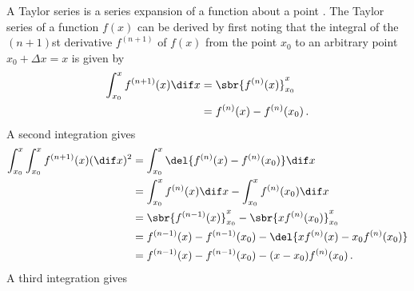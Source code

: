 A Taylor series is a series expansion of a function about a point \parencite{Weisstein2017}.
The Taylor series of a function $f(x)$ can be derived by first noting that the integral of the $(n+1)$st derivative $f^{(n+1)}$ of $f(x)$ from the point $x_0$ to an arbitrary point $x_0 + \Delta x = x$ is given by
\begin{align*}
  \int_{x_0}^x{f^{(n+1)}(x)}\dif x &= \sbr{ f^{(n)}(x) }_{x_0}^x \\
                               &= f^{(n)}(x) - f^{(n)}(x_0) \, .
\end{align*}
A second integration gives
\begin{align*}
  \int_{x_0}^x\int_{x_0}^x{f^{(n+1)}(x)} (\dif x)^2 &= \int_{x_0}^x{\del{ f^{(n)}(x) - f^{(n)}(x_0) }}\dif x \\
                                    &= \int_{x_0}^x{f^{(n)}(x)}\dif x - \int_{x_0}^x{f^{(n)}(x_0)}\dif x \\
                                    &= \sbr{ f^{(n-1)}(x) }_{x_0}^x - \sbr{ x f^{(n)}(x_0) }_{x_0}^x \\
                                    &= f^{(n-1)}(x) - f^{(n-1)}(x_0) - \del{ x f^{(n)}(x) - x_0 f^{(n)}(x_0) } \\
                                    &= f^{(n-1)}(x) - f^{(n-1)}(x_0) - (x - x_0) f^{(n)}(x_0) \, .
\end{align*}
A third integration gives
